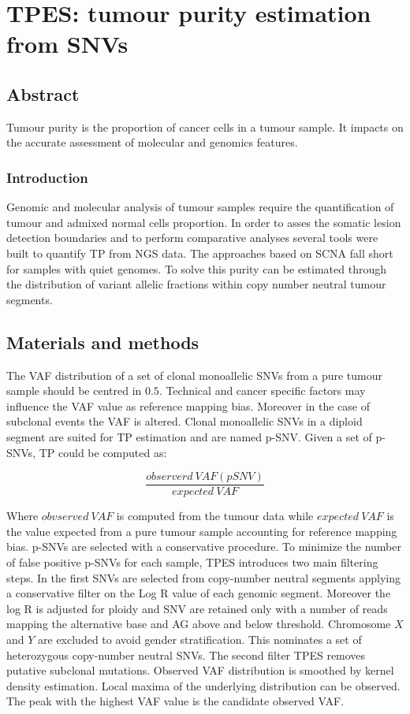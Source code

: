 \graphicspath{{chapters/papers/05/images}}
\chapter{TPES: tumour purity estimation from SNVs}\label{ch:tpes}

\section{Abstract}
Tumour purity is the proportion of cancer cells in a tumour sample.
It impacts on the accurate assessment of molecular and genomics features.

	\subsection{Introduction}
	Genomic and molecular analysis of tumour samples require the quantification of tumour and admixed normal cells proportion.
	In order to asses the somatic lesion detection boundaries and to perform comparative analyses several tools were built to quantify TP from NGS data.
	The approaches based on SCNA fall short for samples with quiet genomes.
	To solve this purity can be estimated through the distribution of variant allelic fractions within copy number neutral tumour segments.

\section{Materials and methods}
The VAF distribution of a set of clonal monoallelic SNVs from a pure tumour sample should be centred in $0.5$.
Technical and cancer specific factors may influence the VAF value as reference mapping bias.
Moreover in the case of subclonal events the VAF is altered.
Clonal monoallelic SNVs in a diploid segment are suited for TP estimation and are named p-SNV.
Given a set of p-SNVs, TP could be computed as:

$$\frac{observerd\ VAF(pSNV)}{expected\ VAF}$$

Where $obvserved\ VAF$ is computed from the tumour data while $expected\ VAF$ is the value expected from a pure tumour sample accounting for reference mapping bias.
p-SNVs are selected with a conservative procedure.
To minimize the number of false positive p-SNVs for each sample, TPES introduces two main filtering steps.
In the first SNVs are selected from copy-number neutral segments applying a conservative filter on the Log R value of each genomic segment.
Moreover the log R is adjusted for ploidy and SNV are retained only with a number of reads mapping the alternative base and AG above and below threshold.
Chromosome $X$ and $Y$ are excluded to avoid gender stratification.
This nominates a set of heterozygous copy-number neutral SNVs.
The second filter TPES removes putative subclonal mutations.
Observed VAF distribution is smoothed by kernel density estimation.
Local maxima of the underlying distribution can be observed.
The peak with the highest VAF value is the candidate observed VAF.
